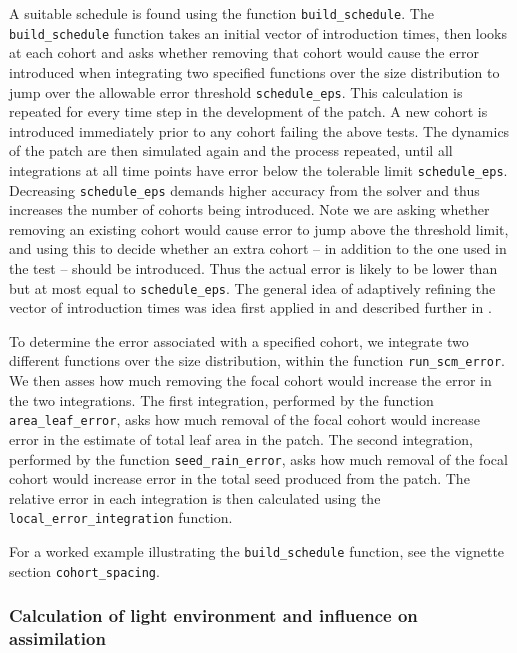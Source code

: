 \documentclass[10pt,twoside]{article}
\begin{document}
A suitable schedule is found using the function \texttt{build\_schedule}.
The \texttt{build\_schedule} function takes an
initial vector of introduction times, then looks at each cohort and asks
whether removing that cohort would cause the error introduced when
integrating two specified functions over the size distribution to jump
over the allowable error threshold \texttt{schedule\_eps}. This
calculation is repeated for every time step in the development of the
patch. A new cohort is introduced immediately prior to any cohort
failing the above tests. The dynamics of the patch are
then simulated again and the process repeated, until all integrations at
all time points have error below the tolerable limit
\texttt{schedule\_eps}. Decreasing \texttt{schedule\_eps} demands higher
accuracy from the solver and thus increases the number of cohorts being
introduced. Note we are asking whether removing an existing cohort would
cause error to jump above the threshold limit, and using this to decide
whether an extra cohort -- in addition to the one used in the test --
should be introduced. Thus the actual error is likely to
be lower than but at most equal to \texttt{schedule\_eps}. The general idea
of adaptively refining the vector of introduction times was idea first applied
in \citet{Falster-2011} and described further in \citet{Falster-2015}.

To determine the error associated with a specified cohort, we integrate
two different functions over the size distribution, within the function
\texttt{run\_scm\_error}. We then asses how much removing the focal
cohort would increase the error in the two integrations. The first
integration, performed by the function \texttt{area\_leaf\_error}, asks
how much removal of the focal cohort would increase error in the
estimate of total leaf area in the patch. The second integration,
performed by the function \texttt{seed\_rain\_error}, asks how much
removal of the focal cohort would increase error in the total seed
produced from the patch. The relative error in each integration is then
calculated using the \texttt{local\_error\_integration} function.

For a worked example illustrating the \texttt{build\_schedule} function,
see the vignette section \texttt{cohort\_spacing}.

\subsubsection{Calculation of light environment and influence on
assimilation}\label{calculation-of-light-environment-and-influence-on-assimilation}
\end{document}
